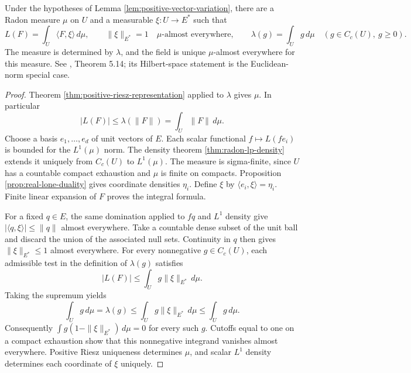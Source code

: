 \begin{theorem}\label{thm:normed-vector-riesz}
Under the hypotheses of Lemma \ref{lem:positive-vector-variation}, there are a Radon measure $\mu$ on $U$ and a measurable $\xi:U\to E^*$ such that
\[
 L(F)=\int_U\langle F,\xi\rangle\,d\mu,\qquad
 \|\xi\|_{E^*}=1\quad\mu\text{-almost everywhere},\qquad
 \lambda(g)=\int_Ug\,d\mu\quad(g\in C_c(U),\ g\geq0).
\]
The measure is determined by $\lambda$, and the field is unique $\mu$-almost everywhere for this measure. See \cite{Sim18}, Theorem 5.14; its Hilbert-space statement is the Euclidean-norm special case.
\end{theorem}
\begin{proof}
Theorem \ref{thm:positive-riesz-representation} applied to $\lambda$ gives $\mu$. In particular
\[
 |L(F)|\leq\lambda(\|F\|)=\int_U\|F\|\,d\mu.
\]
Choose a basis $e_1,\ldots,e_d$ of unit vectors of $E$. Each scalar functional $f\mapsto L(fe_i)$ is bounded for the $L^1(\mu)$ norm. The density theorem \ref{thm:radon-lp-density} extends it uniquely from $C_c(U)$ to $L^1(\mu)$. The measure is sigma-finite, since $U$ has a countable compact exhaustion and $\mu$ is finite on compacts. Proposition \ref{prop:real-lone-duality} gives coordinate densities $\eta_i$. Define $\xi$ by $\langle e_i,\xi\rangle=\eta_i$. Finite linear expansion of $F$ proves the integral formula.

For a fixed $q\in E$, the same domination applied to $fq$ and $L^1$ density give $|\langle q,\xi\rangle|\leq\|q\|$ almost everywhere. Take a countable dense subset of the unit ball and discard the union of the associated null sets. Continuity in $q$ then gives $\|\xi\|_{E^*}\leq1$ almost everywhere. For every nonnegative $g\in C_c(U)$, each admissible test in the definition of $\lambda(g)$ satisfies
\[
 |L(F)|\leq\int_Ug\|\xi\|_{E^*}\,d\mu.
\]
Taking the supremum yields
\[
 \int_Ug\,d\mu=\lambda(g)\leq\int_Ug\|\xi\|_{E^*}\,d\mu\leq\int_Ug\,d\mu.
\]
Consequently $\int g(1-\|\xi\|_{E^*})\,d\mu=0$ for every such $g$. Cutoffs equal to one on a compact exhaustion show that this nonnegative integrand vanishes almost everywhere. Positive Riesz uniqueness determines $\mu$, and scalar $L^1$ density determines each coordinate of $\xi$ uniquely.
\end{proof}

